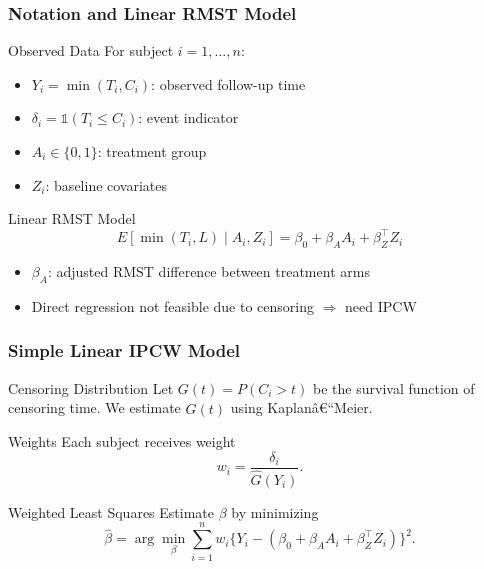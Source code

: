 \documentclass{beamer}
\begin{document}
\begin{frame}
\frametitle{Notation and Linear RMST Model}

\begin{block}{Observed Data}
For subject $i=1,\dots,n$:  
\begin{itemize}
  \item $Y_i = \min(T_i, C_i)$: observed follow-up time  
  \item $\delta_i = \mathbb{1}(T_i \le C_i)$: event indicator  
  \item $A_i \in \{0,1\}$: treatment group  
  \item $Z_i$: baseline covariates
\end{itemize}
\end{block}

\begin{block}{Linear RMST Model}
\[
E[\min(T_i,L) \mid A_i, Z_i] = \beta_0 + \beta_A A_i + \beta_Z^\top Z_i
\]

\begin{itemize}
  \item $\beta_A$: adjusted RMST difference between treatment arms  
  \item Direct regression not feasible due to censoring $\Rightarrow$ need IPCW
\end{itemize}
\end{block}

\end{frame}

\begin{frame}
\frametitle{Simple Linear IPCW Model \citep{zhao2001}}

\begin{block}{Censoring Distribution}
Let $G(t) = P(C_i > t)$ be the survival function of censoring time.  
We estimate $\widehat{G}(t)$ using Kaplanâ€“Meier.
\end{block}

\begin{block}{Weights}
Each subject receives weight
\[
w_i = \frac{\delta_i}{\widehat{G}(Y_i)}.
\]
\end{block}

\begin{block}{Weighted Least Squares}
Estimate $\beta$ by minimizing
\[
\widehat{\beta} = \arg\min_\beta \sum_{i=1}^n w_i \Big\{ Y_i - (\beta_0 + \beta_A A_i + \beta_Z^\top Z_i)\Big\}^2.
\]
\end{block}

\end{frame}
\end{document}

